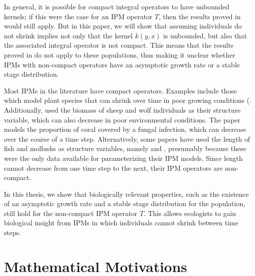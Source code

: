 In general, it is possible for compact integral operators to have unbounded kernels; if this were the case for an IPM operator $T$, then the results proved in \cite{Ellner2006} would still apply. But in this paper, we will show that assuming individuals do not shrink implies not only that the kernel $k(y, x)$ is unbounded, but also that the associated integral operator is not compact. This means that the results proved in \cite{Ellner2006} do not apply to these populations, thus making it unclear whether IPMs with non-compact operators have an asymptotic growth rate or a stable stage distribution.

Most IPMs in the literature have compact operators. Examples include those which model plant species that can shrink over time in poor growing conditions (\cite{Childs2003, Eager2013, Hegland2010, Jacquemyn2010, Miller2012, Tenhumberg2015, Rees2002}.  Additionally, \cite{Childs2011, Ellner2016, Coulson2011} used the biomass of sheep and wolf individuals as their structure variable, which can also decrease in poor environmental conditions. The paper \cite{Bruno2011} models the proportion of coral covered by a fungal infection, which can decrease over the course of a time step. Alternatively, some papers have used the length of fish and mollusks as structure variables, namely \cite{Aalto2019, Ohlberger2020, Stubberud2019, Vindenes2014} and \cite{Vindenes2015}, presumably because these were the only data available for parameterizing their IPM models. Since length cannot decrease from one time step to the next, their IPM operators are non-compact.

In this thesis, we show that biologically relevant properties, such as the existence of an asymptotic growth rate and a stable stage distribution for the population, still hold for the non-compact IPM operator $T$. This allows ecologists to gain biological insight from IPMs in which individuals cannot shrink between time steps.

\section{Mathematical Motivations} \label{section:mathematicalmotivations}

